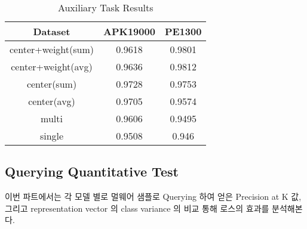 \begin{table}[!htb]%
\caption{Auxiliary Task Results}
\label{tab:auxiliary_result}
\begin{minipage}{\columnwidth}
\begin{center}
\begin{tabular}{|c|c|c|}
\hline
Dataset             & APK19000 & PE1300 \\ \hline
center+weight(sum)  & 0.9618   & 0.9801 \\ \hline
center+weight(avg) & 0.9636   & 0.9812 \\ \hline
center(sum)         & 0.9728   & 0.9753 \\ \hline
center(avg)        & 0.9705   & 0.9574 \\ \hline
multi               & 0.9606   & 0.9495 \\ \hline
single              & 0.9508   & 0.946  \\ \hline
\end{tabular}
\end{center}
\bigskip\centering
\end{minipage}
\end{table}%


\subsection{Querying Quantitative Test}

이번 파트에서는 각 모델 별로 멀웨어 샘플로 Querying 하여 얻은  Precision at K 값, 그리고 representation vector 의 class variance 의 비교 통해 로스의 효과를 분석해본다. 

